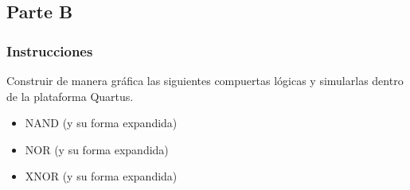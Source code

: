 \documentclass[../procedimientos.tex]{subfiles}
\begin{document}
\subsection{Parte B}
\subsubsection{Instrucciones}
\begin{em}
  Construir de manera gráfica las siguientes compuertas lógicas y simularlas 
  dentro de la plataforma Quartus.
  \begin{itemize}
    \item NAND (y su forma expandida)
    \item NOR (y su forma expandida)
    \item XNOR (y su forma expandida)
  \end{itemize}
\end{em}
\end{document}
